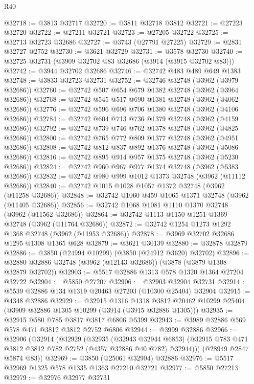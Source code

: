 \begin{lexlean}{R40}
\begin{coremodule}
@32718 := @3813 @32717
@32720 := @3811 @32718 @3812
@32721 := @27223 @32720
@32722 := @27211 @32721
@32723 := @27205 @32722
@32725 := @32713 @32723 @32686
@32727 := @3743 (@27791 @27225)
@32729 := @2831 @32727 @2752
@32730 := @3621 @32729
@32731 := @3578 @32730
@32740 := @32725 @32731 (@3909 @32702 @83 @32686 (@3914 (@3915 @32702 @83)))
@32742 := @3944 @32702 @32686
@32746 := @32742 @483 @489 @649 @1383
@32748 := @3833 @32723 @32731
@32752 := @32746 @32748 (@3962 (@3979 @32686))
@32760 := @32742 @507 @654 @679 @1382 @32748 (@3962 (@3964 @32686))
@32768 := @32742 @545 @517 @690 @1381 @32748 (@3962 (@4062 @32686))
@32776 := @32742 @596 @696 @706 @1380 @32748 (@3962 (@4106 @32686))
@32784 := @32742 @604 @713 @736 @1379 @32748 (@3962 (@4159 @32686))
@32792 := @32742 @739 @746 @762 @1378 @32748 (@3962 (@4825 @32686))
@32800 := @32742 @765 @772 @809 @1377 @32748 (@3962 (@4951 @32686))
@32808 := @32742 @812 @837 @892 @1376 @32748 (@3962 (@5086 @32686))
@32816 := @32742 @895 @914 @957 @1375 @32748 (@3962 (@5230 @32686))
@32824 := @32742 @960 @967 @977 @1374 @32748 (@3962 (@5383 @32686))
@32832 := @32742 @980 @999 @1012 @1373 @32748 (@3962 (@11112 @32686))
@32840 := @32742 @1015 @1028 @1057 @1372 @32748 (@3962 (@11258 @32686))
@32848 := @32742 @1060 @459 @1065 @1371 @32748 (@3962 (@11405 @32686))
@32856 := @32742 @1068 @1081 @1110 @1370 @32748 (@3962 (@11562 @32686))
@32864 := @32742 @1113 @1150 @1251 @1369 @32748 (@3962 (@11764 @32686))
@32872 := @32742 @1254 @1273 @1292 @1368 @32748 (@3962 (@11953 @32686))
@32878 := @3969 @32702 @32686 @1295 @1308 @1365 @628
@32879 := @3621 @30139
@32880 := @32878 @32879
@32886 := @3850 (@24994 @10299) (@3850 (@24912 @3620) @32702)
@32896 := @32880 @32886 @32748 (@3962 (@12143 @32686)) (@3878 (@3879 @1308 @32879 @32702))
@32903 := @5517 @32886 @1313 @578 @1320 @1364 @27204 @32722
@32904 := @5850 @27207
@32906 := @32903 @32904 @32731
@32914 := @5539 @32886 @134 @1319 @20463 @27203 (@10300 @25404) @32904
@32915 := @4348 @32886
@32929 := @32915
    @1316
    @1318
    @3812
    @20462
    @10299
    @25404
    (@3909 @32886 @1305 @10299 (@3914 (@3915 @32886 @1305)))
@32935 := @32915 @580 @785 @3817 @3817 @6806 @5399
@32943 := @3989 @32886 @569 @578 @471 @3812 @3812 @2752 @6806
@32944 := @3999 @32886
@32966 := @32906
    (@32914
      (@32929
        (@32935
          (@32943 @32944 @6853)
          (@32915 @783 @471 @3812 @3812 @782 @2752 (@4357 @32886 @40 @782) @32944)))
      (@28949 @2847 @5874 @83))
@32969 := @3850 (@25061 @32904) @32886
@32976 := @5517 @32969 @1325 @578 @1335 @1363 @27210 @32721
@32977 := @5850 @27213
@32979 := @32976 @32977 @32731

\end{coremodule}
\end{lexlean}

